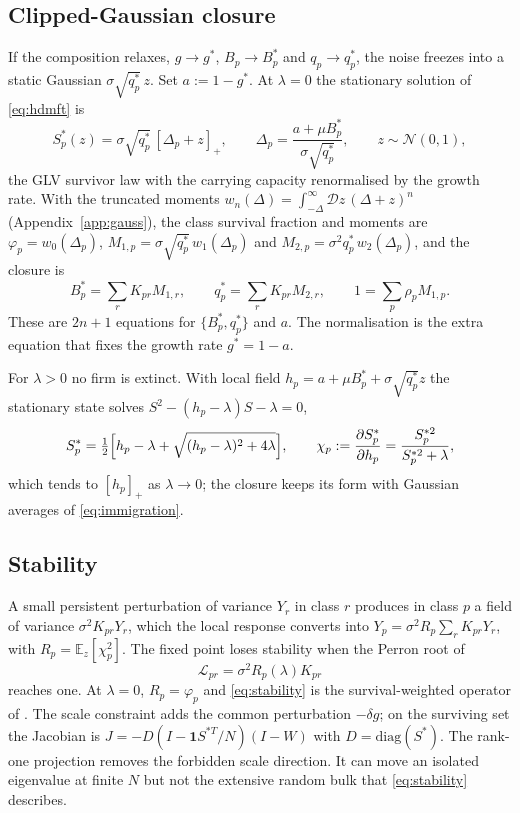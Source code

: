\documentclass[11pt]{article}
\newcommand{\E}{\mathbb E}
\newcommand{\Dz}{\mathcal{D}z}
\begin{document}
\subsection{Clipped-Gaussian closure}

If the composition relaxes, $g\to g^*$, $B_p\to B_p^*$ and $q_p\to q_p^*$, the noise freezes into a
static Gaussian $\sigma\sqrt{q_p^*}\,z$.  Set $a:=1-g^*$.  At $\lambda=0$ the stationary
solution of \eqref{eq:hdmft} is
\begin{equation}
  S_p^*(z)=\sigma\sqrt{q_p^*}\,[\Delta_p+z]_+,\qquad
  \Delta_p=\frac{a+\mu B_p^*}{\sigma\sqrt{q_p^*}},\qquad z\sim\mathcal N(0,1),
  \label{eq:clipped}
\end{equation}
the GLV survivor law \citep{bunin2017,galla2018} with the carrying capacity renormalised by the
growth rate.  With the truncated moments $w_n(\Delta)=\int_{-\Delta}^\infty\Dz\,(\Delta+z)^n$
(Appendix~\ref{app:gauss}), the class survival fraction and moments are $\varphi_p=w_0(\Delta_p)$,
$M_{1,p}=\sigma\sqrt{q_p^*}\,w_1(\Delta_p)$ and $M_{2,p}=\sigma^2q_p^*\,w_2(\Delta_p)$, and the
closure is
\begin{equation}
  B_p^*=\sum_rK_{pr}M_{1,r},\qquad q_p^*=\sum_rK_{pr}M_{2,r},\qquad 1=\sum_p\rho_pM_{1,p} .
  \label{eq:fpclosure}
\end{equation}
These are $2n+1$ equations for $\{B_p^*,q_p^*\}$ and $a$.  The normalisation is the extra equation
that fixes the growth rate $g^*=1-a$.

For $\lambda>0$ no firm is extinct.  With local field $h_p=a+\mu B_p^*+\sigma\sqrt{q_p^*}z$ the
stationary state solves $S^2-(h_p-\lambda)S-\lambda=0$,
\begin{equation}
  S_p^*=\tfrac12\Bigl[h_p-\lambda+\sqrt{(h_p-\lambda)^2+4\lambda}\Bigr],\qquad
  \chi_p:=\frac{\partial S_p^*}{\partial h_p}=\frac{S_p^{*2}}{S_p^{*2}+\lambda},
  \label{eq:immigration}
\end{equation}
which tends to $[h_p]_+$ as $\lambda\to0$; the closure keeps its form with Gaussian averages of
\eqref{eq:immigration}.

\subsection{Stability}

A small persistent perturbation of variance $Y_r$ in class $r$ produces in class $p$ a field of
variance $\sigma^2K_{pr}Y_r$, which the local response converts into $Y_p=\sigma^2R_p\sum_rK_{pr}Y_r$,
with $R_p=\E_z[\chi_p^2]$.  The fixed point loses stability when the Perron root of
\begin{equation}
  \mathcal L_{pr}=\sigma^2R_p(\lambda)K_{pr}
  \label{eq:stability}
\end{equation}
reaches one.  At $\lambda=0$, $R_p=\varphi_p$ and \eqref{eq:stability} is the survival-weighted
operator of \citet{patil2026}.  The scale constraint adds the common perturbation $-\delta g$; on
the surviving set the Jacobian is $J=-D(I-\mathbf 1S^{*T}/N)(I-W)$ with $D=\mathrm{diag}(S^*)$.  The
rank-one projection removes the forbidden scale direction.  It can move an isolated eigenvalue at
finite $N$ but not the extensive random bulk that \eqref{eq:stability} describes.
\end{document}
